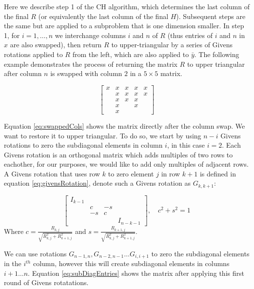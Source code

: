 \documentclass[12pt,Bold,letterpaper]{mcgilletdclass}
\begin{document}
Here we describe  step 1 of the CH algorithm, which determines the last column of the final $R$ 
(or equivalently the last column of the final $H$).
Subsequent steps are the same but are applied to a subproblem that is one dimension smaller. 
In step 1, for $i = 1,\dots,n$ we interchange
columns $i$ and $n$ of  $R$ (thus entries of $i$ and $n$ in $x$ are also swapped), then return $R$ to upper-triangular
by a series of Givens rotations applied to $R$ from the left, which  are also applied to $\bar{y}$. The following example demonstrates the process of returning the matrix $R$ to upper triangular after column $n$ is swapped with column $2$ in a $5 \times 5$ matrix.

\begin{equation} \label{eq:swappedCols}
\begin{bmatrix}
x & x & x & x & x\\ 
  & x & x & x & x\\ 
  & x & x & x &  \\ 
  & x &  &  x &  \\ 
  & x &  &    & 
\end{bmatrix}
\end{equation}

Equation \ref{eq:swappedCols} shows the matrix directly after the column swap. We want to restore it to upper triangular. To do so, we start by using $n-i$ Givens rotations to zero the subdiagonal elements in column $i$, in this case $i = 2$. Each Givens rotation is an orthogonal matrix which adds multiples of two rows to eachother, for our purposes, we would like to add only multiples of adjacent rows. A Givens rotation that uses row $k$ to zero element $j$ in row $k+1$ is defined in equation \eqref{eq:givensRotation}, denote such a Givens rotation as $G_{k,k+1}$:

\begin{equation} \label{eq:givensRotation}
\begin{bmatrix}
I_{k-1} &  &  & \\ 
 & c & -s & \\ 
 & -s & c & \\ 
 &  &  & I_{n-k-1}
\end{bmatrix} ,\quad c^2+s^2=1
\end{equation}
Where $c=\frac{R_{k,j}}{\sqrt{R_{k,j}^2+R_{k+1,j}^2}}$ and $s=\frac{R_{k+1,j}}{\sqrt{R_{k,j}^2+R_{k+1,j}^2}}$.

We can use rotations $G_{n-1,n}, G_{n-2,n-1} \dots G_{i,i+1}$ to zero the subdiagonal elements in the $i^{th}$ column, however this will create subdiagonal elements in columns $i+1 \dots n$. Equation \eqref{eq:subDiagEntries} shows the matrix after applying this first round of Givens rotatations.
\end{document}
